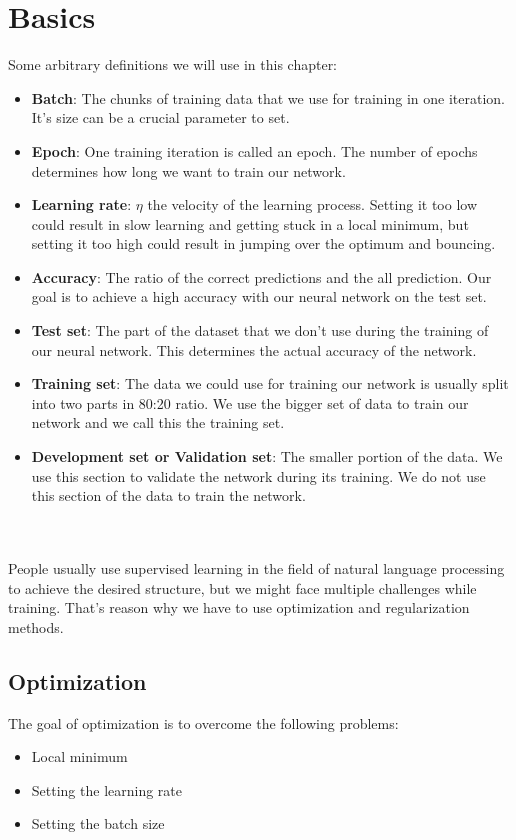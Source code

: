 \section{Basics}
\begin{minipage}{\textwidth}
Some arbitrary definitions we will use in this chapter:
\begin{itemize}
	\item \textbf{Batch}: The chunks of training data that we use for training in one iteration. It's size can be a crucial parameter to set.
	\item \textbf{Epoch}: One training iteration is called an epoch. The number of epochs determines how long we want to train our network.
	\item \textbf{Learning rate}: \(\eta\) the velocity of the learning process. Setting it too low could result in slow learning and getting stuck in a local minimum, but setting it too high could result in jumping over the optimum and bouncing.
	\item \textbf{Accuracy}: The ratio of the correct predictions and the all prediction. Our goal is to achieve a high accuracy with our neural network on the test set.
	\item \textbf{Test set}: The part of the dataset that we don't use during the training of our neural network. This determines the actual accuracy of the network.
	\item \textbf{Training set}: The data we could use for training our network is usually split into two parts in 80:20 ratio. We use the bigger set of data to train our network and we call this the training set.
	\item \textbf{Development set or Validation set}: The smaller portion of the data. We use this section to validate the network during its training. We do not use this section of the data to train the network.
\end{itemize}
\end{minipage}
\\
\\
People usually use supervised learning in the field of natural language processing to achieve the desired structure, but we might face multiple challenges while training. That's reason why we have to use optimization and regularization methods.

\subsection{Optimization}
The goal of optimization is to overcome the following problems:
\begin{itemize}
	\item Local minimum
	\item Setting the learning rate
	\item Setting the batch size
\end{itemize}

